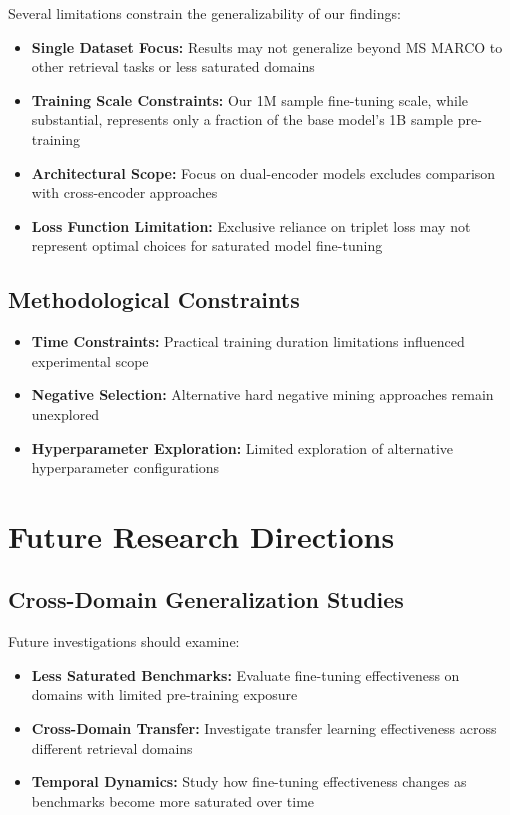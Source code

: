 Several limitations constrain the generalizability of our findings:

\begin{itemize}
\item \textbf{Single Dataset Focus:} Results may not generalize beyond MS MARCO to other retrieval tasks or less saturated domains
\item \textbf{Training Scale Constraints:} Our 1M sample fine-tuning scale, while substantial, represents only a fraction of the base model's 1B sample pre-training
\item \textbf{Architectural Scope:} Focus on dual-encoder models excludes comparison with cross-encoder approaches
\item \textbf{Loss Function Limitation:} Exclusive reliance on triplet loss \cite{sbert_losses} may not represent optimal choices for saturated model fine-tuning
\end{itemize}

\subsection{Methodological Constraints}

\begin{itemize}
\item \textbf{Time Constraints:} Practical training duration limitations influenced experimental scope
\item \textbf{Negative Selection:} Alternative hard negative mining approaches remain unexplored
\item \textbf{Hyperparameter Exploration:} Limited exploration of alternative hyperparameter configurations
\end{itemize}

\section{Future Research Directions}

\subsection{Cross-Domain Generalization Studies}

Future investigations should examine:

\begin{itemize}
\item \textbf{Less Saturated Benchmarks:} Evaluate fine-tuning effectiveness on domains with limited pre-training exposure
\item \textbf{Cross-Domain Transfer:} Investigate transfer learning effectiveness across different retrieval domains
\item \textbf{Temporal Dynamics:} Study how fine-tuning effectiveness changes as benchmarks become more saturated over time
\end{itemize}

